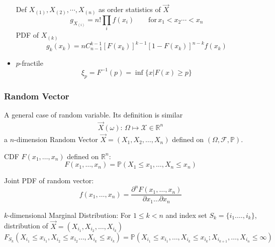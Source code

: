 \begin{itemize}
        Def $X_{(1)},X_{(2)},\cdots,X_{(n)}$ as order statistics of $\vec{X}$
        \begin{equation}    
            g_{X_{(i)}}=n!\prod_i f(x_i)\qquad \mathrm{for}\, x_1<x_2\cdots <x_n    
        \end{equation}
        PDF of $X_{(k)}$
        \begin{equation}    
            g_k(x_k)=nC_{n-1}^{k-1}[F(x_k)]^{k-1}[1-F(x_k)]^{n-k}f(x_k)
        \end{equation}
        \item $p$-fractile
        \begin{equation}    \xi_p=F^{-1}(p)=\inf\{x|F(x)\geq p\}\end{equation}
    \end{itemize}






\subsubsection{Random Vector}
    A general case of random variable. Its definition is similar    
    \begin{align}
        \vec{X}(\omega ):\, \Omega \mapsto \mathscr{X}\in\mathbb{R}^n 
    \end{align}
    a $n$-dimension Random Vector $\vec{X}=(X_1,X_2,\ldots,X_n)$ defined on $(\Omega,\mathscr{F},\mathbb{P})$.

    CDF $F(x_1,\ldots,x_n)$ defined on $\mathbb{R}^n$:
    \begin{equation}F(x_1,\ldots,x_n)=\mathbb{P}(X_1\leq x_1,\ldots,X_n\leq x_n)\end{equation}

    Joint PDF of random vector: 
    \begin{equation}
        f(x_1,\ldots,x_n)=\dfrac{\partial^n F(x_1,\ldots,x_n)}{\partial x_1\ldots\partial x_n}
    \end{equation}

    $k$-dimensional Marginal Distribution: For $1\leq k<n$ and index set $S_k=\{i_1.\ldots,i_k\}$, distribution of $\vec{X}=(X_{i_1},X_{i_2},\ldots,X_{i_k})$
    \begin{equation}F_{S_k}(X_{i_1}\leq x_{i_1},X_{i_2}\leq x_{i_2}\ldots,X_{i_k}\leq x_{i_k})=\mathbb{P}(X_{i_1}\leq x_{i_1},\ldots,X_{i_k}\leq x_{i_k};X_{i_{k+1}},\ldots,X_{i_n}\leq\infty)\end{equation}

